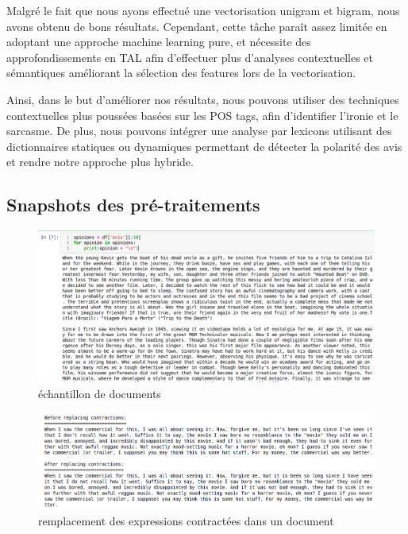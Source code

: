 \documentclass[12pt,a4paper]{report}
\theoremstyle{definition}
\begin{document}
Malgré le fait que nous ayons effectué une vectorisation unigram et bigram, nous avons obtenu de bons résultats. Cependant, cette tâche paraît assez limitée en adoptant une approche machine learning pure, et nécessite des approfondissements en TAL afin d'effectuer plus d'analyses contextuelles et sémantiques améliorant la sélection des features lors de la vectorisation.

Ainsi, dans le but d'améliorer nos résultats, nous pouvons utiliser des techniques contextuelles plus poussées basées sur les POS tags, afin d'identifier l'ironie et le sarcasme. De plus, nous pouvons intégrer une analyse par lexicons utilisant des dictionnaires statiques ou dynamiques permettant de détecter la polarité des avis et rendre notre approche plus hybride.

\begin{appendices}
\chapter{Snapshots des pré-traitements}
\begin{figure}[!ht]
  \centering
  \includegraphics[scale=0.4]{images/snapshots/preprocessing/documents_sample.png}
  \caption{échantillon de documents}
  \label{fig:document_sample}
\end{figure}

\begin{figure}[!ht]
  \centering
  \includegraphics[scale=0.4]{images/snapshots/preprocessing/replace_contractions.png}
  \caption{remplacement des expressions contractées dans un document}
  \label{fig:replace_contractions}
\end{figure}


\end{appendices}
\end{document}

